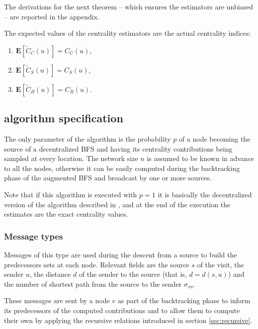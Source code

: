 The derivations for the next theorem -- which ensures the estimators are unbiased -- are reported in the appendix.

\begin{theorem}
\label{th:expect}
The expected values of the centrality estimators are the actual centrality indices:
 \begin{enumerate}[label=\textup{(\alph*)}]
  \item $\mathbf{E}[\widetilde{C}_C(u)] = \widehat{C}_C(u)$,
  \item $\mathbf{E}[\widetilde{C}_S(u)] = C_S(u)$,
  \item $\mathbf{E}[\widetilde{C}_B(u)] = C_B(u)$.
  \end{enumerate}
\end{theorem}

\subsection{\multibfs{} algorithm specification}

The only parameter of the algorithm is the probability $p$ of a node becoming the source of a decentralized BFS and having its centrality contributions being sampled at every location. The network size $n$ is assumed to be known in advance to all the nodes, otherwise it can be easily computed during the backtracking phase of the augmented BFS and broadcast by one or more sources.

\pagebreak
Note that if this algorithm is executed with $p=1$ it is basically the decentralized version of the algorithm described in \cite{brandes2001}, and at the end of the execution the estimates are the exact centrality values.

\subsubsection{Message types}
\begin{description}[leftmargin=0cm]
\item[\mdiscargs{s}{u}{d}] Messages of this type are used during the descent from a source to build the predecessors sets at each node. Relevant fields are the source $s$ of the visit, the sender $u$, the distance $d$ of the sender to the source (that is, $d = d(s,u)$) and the number of shortest path from the source to the sender $\sigma_{su}$.

\item[\mrepargs{s}{v}] These messages are sent by a node $v$ as part of the backtracking phase to inform its predecessors of the computed contributions and to allow them to compute their own by applying the recursive relations introduced in section \ref{sec:recursive}.
\end{description}

